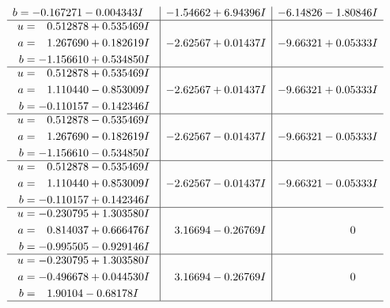 \documentclass[1p]{elsarticle_modified}
\theoremstyle{definition}
\begin{document}
$$\begin{array}{c|c|c}
\begin{aligned}
b &= -0.167271 - 0.004343 I\end{aligned}
 & -1.54662 + 6.94396 I & -6.14826 - 1.80846 I \\ \hline\begin{aligned}
u &= \phantom{-}0.512878 + 0.535469 I \\
a &= \phantom{-}1.267690 + 0.182619 I \\
b &= -1.156610 + 0.534850 I\end{aligned}
 & -2.62567 + 0.01437 I & -9.66321 + 0.05333 I \\ \hline\begin{aligned}
u &= \phantom{-}0.512878 + 0.535469 I \\
a &= \phantom{-}1.110440 - 0.853009 I \\
b &= -0.110157 - 0.142346 I\end{aligned}
 & -2.62567 + 0.01437 I & -9.66321 + 0.05333 I \\ \hline\begin{aligned}
u &= \phantom{-}0.512878 - 0.535469 I \\
a &= \phantom{-}1.267690 - 0.182619 I \\
b &= -1.156610 - 0.534850 I\end{aligned}
 & -2.62567 - 0.01437 I & -9.66321 - 0.05333 I \\ \hline\begin{aligned}
u &= \phantom{-}0.512878 - 0.535469 I \\
a &= \phantom{-}1.110440 + 0.853009 I \\
b &= -0.110157 + 0.142346 I\end{aligned}
 & -2.62567 - 0.01437 I & -9.66321 - 0.05333 I \\ \hline\begin{aligned}
u &= -0.230795 + 1.303580 I \\
a &= \phantom{-}0.814037 + 0.666476 I \\
b &= -0.995505 - 0.929146 I\end{aligned}
 & \phantom{-}3.16694 - 0.26769 I & \phantom{-0.000000 } 0 \\ \hline\begin{aligned}
u &= -0.230795 + 1.303580 I \\
a &= -0.496678 + 0.044530 I \\
b &= \phantom{-}1.90104 - 0.68178 I\end{aligned}
 & \phantom{-}3.16694 - 0.26769 I & \phantom{-0.000000 } 0\\
 \hline 
 \end{array}$$\newpage$$\begin{array}{c|c|c}  

\end{array}$$
\end{document}
